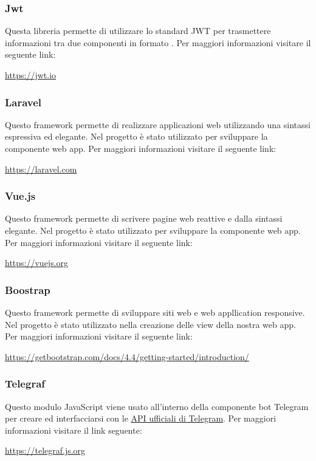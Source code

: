 		\subsubsection{Jwt}
			Questa libreria permette di utilizzare lo standard JWT per trasmettere informazioni tra due componenti in formato .
			\newline
			Per maggiori informazioni visitare il seguente link:
			\newline
			\begin{center}
				\url{https://jwt.io}
			\end{center}
		\subsubsection{Laravel}
			Questo framework permette di realizzare applicazioni web utilizzando una sintassi espressiva ed elegante. Nel progetto è stato utilizzato per sviluppare la componente web app.
			\newline
			Per maggiori informazioni visitare il seguente link:
			\newline
			\begin{center}
				\url{https://laravel.com}
			\end{center}
		\subsubsection{Vue.js}
			Questo framework permette di scrivere pagine web reattive e dalla sintassi elegante. Nel progetto è stato utilizzato per sviluppare la componente web app.
			\newline
			Per maggiori informazioni visitare il seguente link:
			\newline
			\begin{center}
				\url{https://vuejs.org}
			\end{center}
		\subsubsection{Boostrap}
			Questo framework permette di sviluppare siti web e web appllication responsive. Nel progetto è stato utilizzato nella creazione delle view della nostra web app.
			\newline
			Per maggiori informazioni visitare il seguente link:
			\newline
			\begin{center}
				\url{https://getbootstrap.com/docs/4.4/getting-started/introduction/}
			\end{center}	
		\subsubsection{Telegraf}
			Questo modulo JavaScript viene usato all'interno della componente bot Telegram per creare ed interfacciarsi con le \href{https://core.telegram.org/bots/api}{API ufficiali di Telegram}.
			\newline
			Per maggiori informazioni visitare il link seguente:
			\newline
			\begin{center}
				\url{https://telegraf.js.org}
			\end{center}
	